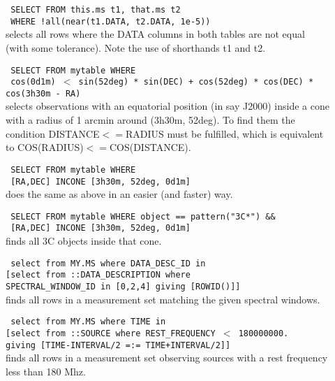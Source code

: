 \begin{description}
  \item[] \texttt{ SELECT FROM this.ms t1, that.ms t2}
     \\\texttt{ WHERE !all(near(t1.DATA, t2.DATA, 1e-5))}
     \\ selects all rows where the DATA columns in both tables are
     not equal (with some tolerance). Note the use of shorthands t1 and t2.

  \item[] \texttt{ SELECT FROM mytable WHERE}
     \\\texttt{ cos(0d1m) $<$
         sin(52deg) * sin(DEC) + cos(52deg) * cos(DEC) *
         cos(3h30m - RA) }
     \\selects observations with an equatorial position (in say J2000)
     inside a cone with a radius of 1 arcmin around (3h30m, 52deg).
     To find them the condition DISTANCE$<=$RADIUS must be fulfilled,
     which is equivalent to COS(RADIUS)$<=$COS(DISTANCE).

  \item[] \texttt{ SELECT FROM mytable WHERE}
     \\\texttt{ [RA,DEC] INCONE [3h30m, 52deg, 0d1m] }
     \\does the same as above in an easier (and faster) way.

  \item[] \texttt{ SELECT FROM mytable WHERE object == pattern("3C*") \&\&}
     \\\texttt{ [RA,DEC] INCONE [3h30m, 52deg, 0d1m] }
     \\finds all 3C objects inside that cone.

  \item[] \texttt{ select from MY.MS where DATA\_DESC\_ID in}
      \\\texttt{[select from ::DATA\_DESCRIPTION where}
      \\\texttt{SPECTRAL\_WINDOW\_ID in [0,2,4] giving [ROWID()]]}
      \\finds all rows in a measurement set matching the given
      spectral windows.

  \item[] \texttt{ select from MY.MS where TIME in}
      \\\texttt{[select from ::SOURCE where REST\_FREQUENCY $<$ 180000000.}
      \\\texttt{giving [TIME-INTERVAL/2 =:= TIME+INTERVAL/2]]}
      \\finds all rows in a measurement set observing sources with a
      rest frequency less than 180 Mhz.


\end{description}
